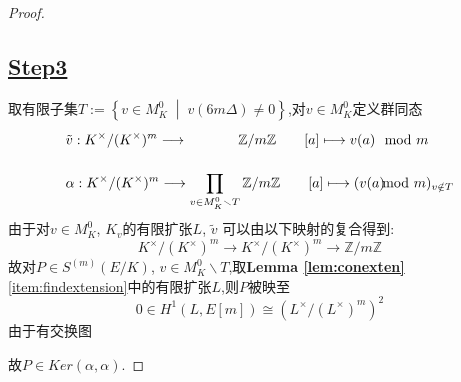 \documentclass[12pt,A4paper,oneside,reqno]{amsart}
\numberwithin{equation}{section}
\theoremstyle{definition}
\theoremstyle{plain}
\theoremstyle{plain}
\numberwithin{equation}{section}
\theoremstyle{remark}
\begin{document}
\begin{proof}
\subsection*{\underline{Step3}}
取有限子集$T:=\left\{ v \in M_K^0\;\middle|\; v(6m\Delta)\neq 0 \right\} $,对$v \in M_K^0$定义群同态
\begin{equation*}
\begin{aligned}
	&\tilde{v}:K^{\times}/(K^{\times})^m \longrightarrow \phantom{\prod_{v\in M_K^0 \smallsetminus T}} \mathbb{Z}/m\mathbb{Z} \qquad [a] \longmapsto v(a) \mod m\\
	&\alpha:K^{\times}/(K^{\times})^m \longrightarrow  \prod_{v\in M_K^0 \smallsetminus T} \mathbb{Z}/m\mathbb{Z} \qquad [a] \longmapsto (v(a) \hspace{-0.3cm}\mod m)_{v \notin T}\\
\end{aligned}
\end{equation*}
由于对$v \in M_K^0$, $K_v$的有限扩张$L$, $\tilde{v}$ 可以由以下映射的复合得到:
$$K^{\times}/(K^{\times})^m \longrightarrow K^{\times}/(K^{\times})^m \longrightarrow \mathbb{Z}/m\mathbb{Z}$$
故对$P \in S^{(m)}(E/K)$, $v \in M_K^0 \smallsetminus T$,取\textbf{Lemma \ref{lem:conexten}} \ref{item:findextension}中的有限扩张$L$,则$P$被映至
$$0 \in H^1(L,E[m]) \cong (L^{\times}/(L^{\times})^m)^2$$
由于有交换图
\begin{center}
\end{center}
故$P \in Ker (\alpha, \alpha)$.

\end{proof}
\end{document}

